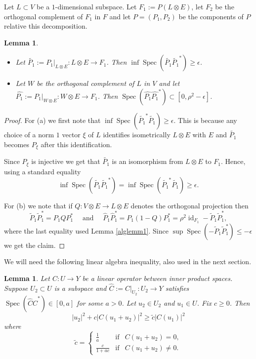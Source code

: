 \documentclass[12pt]{amsart} %
\newtheorem{lemma}[theorem]{Lemma}
\theoremstyle{definition}
\numberwithin{equation}{section}
\DeclareMathOperator{\id}{id}
\DeclareMathOperator{\Spec}{Spec}
\newcommand{\ra}{\rightarrow}
\begin{document}
Let $L\subset V$ be a $1$-dimensional subspace. Let $F_1:=P(L\otimes E)$, let $F_2$ be the orthogonal complement of $F_1$ in $F$ and let $P=(P_1,P_2)$ be the components of $P$ relative this decomposition.
\begin{lemma} \label{alglem0}
\begin{itemize}
\item[(a)] Let $\tilde{P_1}:=P_1\bigr|_{L\otimes E}:L\otimes E\ra F_1$. Then $\inf\Spec(\tilde{P_1}\tilde{P_1}^ *)\geq \epsilon$.
\item[(b)] Let $W$ be the orthogonal complement of $L$ in $V$ and let $\hat{P_1}:=P_1\bigr|_{W\otimes E}:W \otimes E \ra F_1$. Then $\Spec(\hat{P_1}\hat{P_1}^ *)\subset [0,\rho^ 2-\epsilon]$.

\end{itemize}
\end{lemma}
\begin{proof} For (a) we first note that $\inf \Spec (\tilde{P_1}^ *\tilde{P_1})\geq \epsilon$. This is because any choice of a norm $1$ vector $\xi$ of $L$ identifies isometrically $L\otimes E$ with $E$ and $\tilde{P_1}$ becomes $P_{\xi}$ after this identification. 

Since $P_{\xi}$ is injective we get that $\tilde{P_1}$ is an isomorphism from $L \otimes E$ to $F_1$. Hence, using a standard equality \[\inf\Spec(\tilde{P_1}\tilde{P_1}^*)=\inf\Spec(\tilde{P_1}^ *\tilde{P_1})\geq \epsilon. \]


For (b) we note that if $Q:V\otimes E\ra L\otimes E$ denotes the orthogonal projection then 
\[\tilde{P}_1\tilde{P}_1^ *=P_1QP_1^ *\quad\mbox{ and }\quad\hat{P}_1\hat{P}_1^ *=P_1(1-Q)P_1^ *=\rho^ 2\id_{F_1}-\tilde{P}_1\tilde{P}_1^ * ,\] 
where the last equality used Lemma \ref{alglemm1}. Since $\sup\Spec(-\tilde{P}_1\tilde{P}_1^ * )\leq -\epsilon$ we get the claim. 
\end{proof}

We will need the following linear algebra inequality, also used in the next section.

\begin{lemma}\label{alglem}  Let $C:U\ra Y$ be a linear operator between inner product spaces. Suppose $U_2\subset U$ is a subspace  and $\hat{C}:=C\bigr|_{U_2}:U_2\ra Y$ satisfies $\Spec(\hat{C}\hat{C}^ *)\in [0,a]$ for some $a>0$. Let $u_2\in U_2$ and $u_1\in U$. Fix $c\geq 0$. Then
\begin{equation}\label{eq01}|u_2|^ 2+ c|C(u_1+u_2)|^ 2\geq \tilde{c}|C(u_1)|^ 2\end{equation}
where
\[ \tilde{c}=\left\{\begin{array}{ccc} \frac{1}{a} & \mbox {if} & C(u_1+u_2)=0 , \\
  \frac{c}{1+ac} &\mbox{if} & C(u_1+u_2)\neq 0 . \end{array}\right. \]

\end{lemma}
\end{document}
